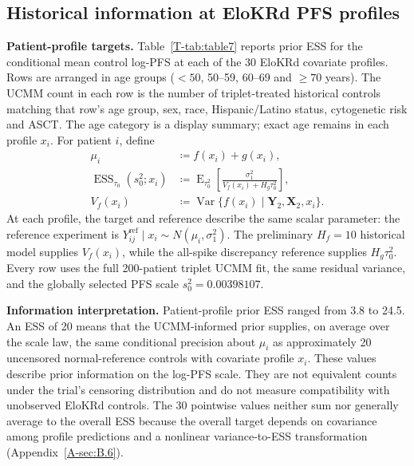 \documentclass[11pt]{article}
\newcommand{\E}{\operatorname{E}}
\newcommand{\Var}{\operatorname{Var}}
\newcommand{\ESS}{\operatorname{ESS}}
\theoremstyle{remark}\newtheorem{remark}{Remark}[section]
\providecommand{\DIFdeltex}[1]{{\protect\color{red} \scriptsize #1}} %
\providecommand{\DIFdelbegin}{} %
\providecommand{\DIFdelend}{} %
\providecommand{\DIFdel}[1]{\texorpdfstring{\DIFdeltex{#1}}{}} %
\begin{document}
\subsection{Historical information at EloKRd PFS profiles}
\DIFdelbegin %
\DIFdel{\textbf{Patient-profile targets.}
}\DIFdelend Table~\ref{T-tab:table7} reports prior ESS for the conditional mean control log-PFS at each of the 30 EloKRd covariate profiles. Rows are arranged in age groups ($<50$, 50--59, 60--69 and $\geq70$ years). The UCMM count in each row is the number of triplet-treated historical controls matching that row's age group, sex, race, Hispanic/Latino status, cytogenetic risk and ASCT. The age category is a display summary; exact age remains in each profile $x_i$. For patient $i$, define
\begin{equation}\label{eq:profile}
\begin{aligned}
\mu_i&\coloneqq f(x_i)+g(x_i),\\
\ESS_{\tau_0}(s_0^2;x_i)&\coloneqq
\E_{\tau_0^2}\!\left[
\frac{\sigma_1^2}{V_f(x_i)+H_g\tau_0^2}
\right],\\
V_f(x_i)&\coloneqq
\Var\{f(x_i)\mid\mathbf Y_2,\mathbf X_2,x_i\}.
\end{aligned}
\end{equation}
At each profile, the target and reference describe the same scalar parameter: the reference experiment is $Y_{ij}^{\mathrm{ref}}\mid x_i\sim N(\mu_i,\sigma_1^2)$. The preliminary $H_f=10$ historical model supplies $V_f(x_i)$, while the all-spike discrepancy reference supplies $H_g\tau_0^2$. Every row uses the full 200-patient triplet UCMM fit, the same residual variance, and the globally selected PFS scale $s_0^2=0.00398107$.

\DIFdelbegin %
\DIFdel{\textbf{Information interpretation.}
}\DIFdelend Patient-profile prior ESS ranged from 3.8 to 24.5. An ESS of 20 means that the UCMM-informed prior supplies, on average over the scale law, the same conditional precision about $\mu_i$ as approximately 20 uncensored normal-reference controls with covariate profile $x_i$. These values describe prior information on the log-PFS scale. They are not equivalent counts under the trial's censoring distribution and do not measure compatibility with unobserved EloKRd controls. The 30 pointwise values neither sum nor generally average to the overall ESS because the overall target depends on covariance among profile predictions and a nonlinear variance-to-ESS transformation (Appendix~\ref{A-sec:B.6}).
\end{document}
